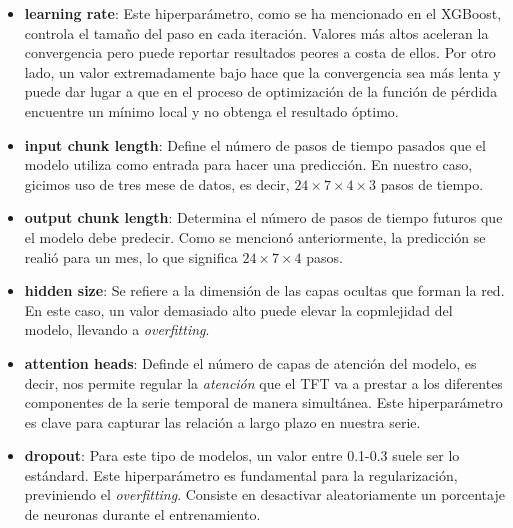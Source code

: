 \begin{itemize}
    \item \textbf{learning rate}: Este hiperparámetro, como se ha mencionado en el XGBoost, controla el tamaño del paso en cada iteración. Valores más altos aceleran la convergencia pero puede reportar resultados peores a costa de ellos. Por otro lado, un valor extremadamente bajo hace que la convergencia sea más lenta y puede dar lugar a que en el proceso de optimización de la función de pérdida encuentre un mínimo local y no obtenga el resultado óptimo.
    
    \item \textbf{input chunk length}: Define el número de pasos de tiempo pasados que el modelo utiliza como entrada para hacer una predicción. En nuestro caso, gicimos uso de tres mese de datos, es decir, $24 \times 7 \times 4 \times 3$ pasos de tiempo.
    \item \textbf{output chunk length}: Determina el número de pasos de tiempo futuros que el modelo debe predecir. Como se mencionó anteriormente, la predicción se realió para un mes, lo que significa $24 \times 7 \times 4$ pasos.
     
    \item \textbf{hidden size}: Se refiere a la dimensión de las capas ocultas que forman la red. En este caso, un valor demasiado alto puede elevar la copmlejidad del modelo, llevando a \textit{overfitting}.
     
    \item \textbf{attention heads}: Definde el número de capas de atención del modelo, es decir, nos permite regular la \textit{atención} que el TFT va a prestar a los diferentes componentes de la serie temporal de manera simultánea. Este hiperparámetro es clave para capturar las relación a largo plazo en nuestra serie.
     
    \item \textbf{dropout}: Para este tipo de modelos, un valor entre 0.1-0.3 suele ser lo estándard. Este hiperparámetro es fundamental para la regularización, previniendo el \textit{overfitting}. Consiste en desactivar aleatoriamente un porcentaje de neuronas durante el entrenamiento.
\end{itemize}

